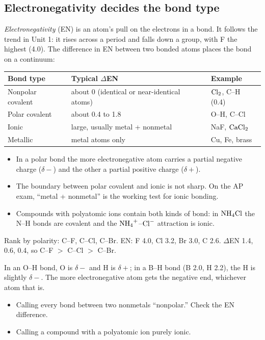 \documentclass[11pt]{article}
\begin{document}
\subsection{Electronegativity decides the bond type}
\emph{Electronegativity} (EN) is an atom's pull on the electrons in a bond. It follows the trend in Unit 1: it rises across a period and falls down a group, with F the highest (4.0). The difference in EN between two bonded atoms places the bond on a continuum:
\begin{center}
\begin{tabular}{lll}\toprule
Bond type & Typical $\Delta$EN & Example \\ \midrule
Nonpolar covalent & about 0 (identical or near-identical atoms) & $\ce{Cl2}$, C--H (0.4) \\
Polar covalent & about 0.4 to 1.8 & O--H, C--Cl \\
Ionic & large, usually metal + nonmetal & NaF, $\ce{CaCl2}$ \\
Metallic & metal atoms only & Cu, Fe, brass \\ \bottomrule
\end{tabular}
\end{center}
\begin{itemize}
\item In a polar bond the more electronegative atom carries a partial negative charge ($\delta-$) and the other a partial positive charge ($\delta+$).
\item The boundary between polar covalent and ionic is not sharp. On the AP exam, ``metal + nonmetal'' is the working test for ionic bonding.
\item Compounds with polyatomic ions contain both kinds of bond: in $\ce{NH4Cl}$ the N--H bonds are covalent and the $\ce{NH4+}$--$\ce{Cl-}$ attraction is ionic.
\end{itemize}

 Rank by polarity: C--F, C--Cl, C--Br. EN: F 4.0, Cl 3.2, Br 3.0, C 2.6. $\Delta$EN 1.4, 0.6, 0.4, so C--F $>$ C--Cl $>$ C--Br.

 In an O--H bond, O is $\delta-$ and H is $\delta+$; in a B--H bond (B 2.0, H 2.2), the H is slightly $\delta-$. The more electronegative atom gets the negative end, whichever atom that is.

\errorsh
\begin{itemize}
\item Calling every bond between two nonmetals ``nonpolar.'' Check the EN difference.
\item Calling a compound with a polyatomic ion purely ionic.
\end{itemize}
\end{document}
